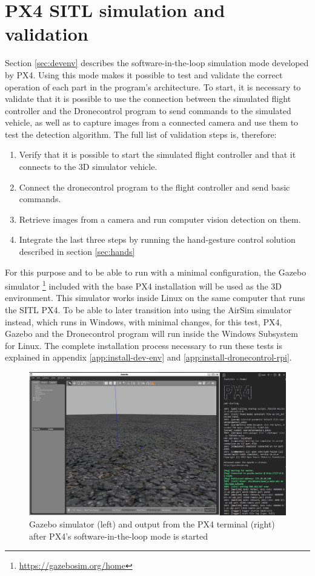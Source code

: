 \section{PX4 SITL simulation and validation}
\label{sec:test-2-sitl}

Section \ref{sec:devenv} describes the software-in-the-loop simulation mode developed by PX4.
Using this mode makes it possible to test and validate the correct operation of each part in the program's architecture.
To start, it is necessary to validate that it is possible to use the connection between the simulated flight controller and the Dronecontrol program to send commands to the simulated vehicle, as well as to capture images from a connected camera and use them to test the detection algorithm.
The full list of validation steps is, therefore:
\begin{enumerate}
    \item Verify that it is possible to start the simulated flight controller and that it connects to the 3D simulator vehicle.
    \item Connect the dronecontrol program to the flight controller and send basic commands.
    \item Retrieve images from a camera and run computer vision detection on them.
    \item Integrate the last three steps by running the hand-gesture control solution described in section \ref{sec:hands}
\end{enumerate}

For this purpose and to be able to run with a minimal configuration, the Gazebo simulator \footnote{\url{https://gazebosim.org/home}} included with the base PX4 installation will be used as the 3D environment.
This simulator works inside Linux on the same computer that runs the SITL PX4.
To be able to later transition into using the AirSim simulator instead, which runs in Windows, with minimal changes, for this test, PX4, Gazebo and the Dronecontrol program will run inside the Windows Subsystem for Linux.
The complete installation process necessary to run these tests is explained in appendix \ref{app:install-dev-env} and \ref{app:install-dronecontrol-rpi}.

\begin{figure}
  \centering
  \includegraphics[width=.8\textwidth, keepaspectratio]{img/gazebo.png}
  \caption{Gazebo simulator (left) and output from the PX4 terminal (right) after PX4's software-in-the-loop mode is started}\label{fig:gazebo}
\end{figure}

